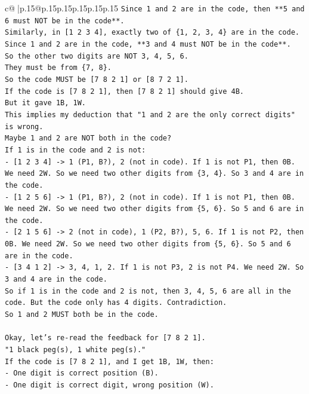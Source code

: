\documentclass{article}
\begin{document}
{\begin{supertabular}{c@{$\;$}|p{.15\linewidth}@{}p{.15\linewidth}p{.15\linewidth}p{.15\linewidth}p{.15\linewidth}p{.15\linewidth}}
{{{\texttt{Since 1 and 2 are in the code, then **5 and 6 must NOT be in the code**.} \\
\texttt{Similarly, in {[}1 2 3 4{]}, exactly two of \{1, 2, 3, 4\} are in the code. Since 1 and 2 are in the code, **3 and 4 must NOT be in the code**.} \\
\texttt{So the other two digits are NOT 3, 4, 5, 6.} \\
\texttt{They must be from \{7, 8\}.} \\
\texttt{So the code MUST be {[}7 8 2 1{]} or {[}8 7 2 1{]}.} \\
\texttt{If the code is {[}7 8 2 1{]}, then {[}7 8 2 1{]} should give 4B.} \\
\texttt{But it gave 1B, 1W.} \\
\texttt{This implies my deduction that "1 and 2 are the only correct digits" is wrong.} \\
\texttt{Maybe 1 and 2 are NOT both in the code?} \\
\texttt{If 1 is in the code and 2 is not:} \\
\texttt{{-} {[}1 2 3 4{]} {-}> 1 (P1, B?), 2 (not in code). If 1 is not P1, then 0B. We need 2W. So we need two other digits from \{3, 4\}. So 3 and 4 are in the code.} \\
\texttt{{-} {[}1 2 5 6{]} {-}> 1 (P1, B?), 2 (not in code). If 1 is not P1, then 0B. We need 2W. So we need two other digits from \{5, 6\}. So 5 and 6 are in the code.} \\
\texttt{{-} {[}2 1 5 6{]} {-}> 2 (not in code), 1 (P2, B?), 5, 6. If 1 is not P2, then 0B. We need 2W. So we need two other digits from \{5, 6\}. So 5 and 6 are in the code.} \\
\texttt{{-} {[}3 4 1 2{]} {-}> 3, 4, 1, 2. If 1 is not P3, 2 is not P4. We need 2W. So 3 and 4 are in the code.} \\
\texttt{So if 1 is in the code and 2 is not, then 3, 4, 5, 6 are all in the code. But the code only has 4 digits. Contradiction.} \\
\texttt{So 1 and 2 MUST both be in the code.} \\
\\ 
\texttt{Okay, let's re{-}read the feedback for {[}7 8 2 1{]}.} \\
\texttt{"1 black peg(s), 1 white peg(s)."} \\
\texttt{If the code is {[}7 8 2 1{]}, and I get 1B, 1W, then:} \\
\texttt{{-} One digit is correct position (B).} \\
\texttt{{-} One digit is correct digit, wrong position (W).} \\
}}}
\end{supertabular}}
\end{document}
